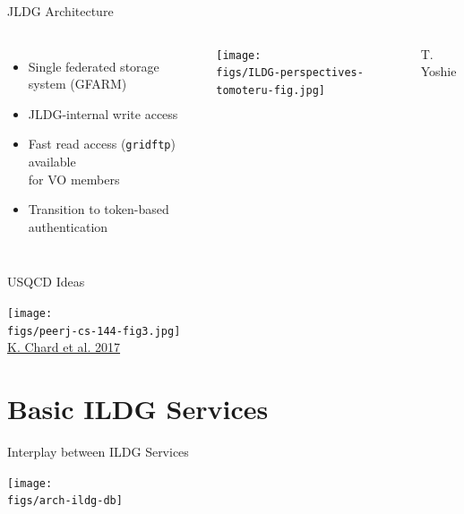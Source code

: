 \documentclass[aspectratio=169,xcolor=dvipsnames]{beamer}
\def\figs{figs3}
\begin{document}
\begin{frame}{JLDG Architecture}

  \begin{columns}[c]  
    \begin{itemize}
    \item Single federated storage system (GFARM)
    \item JLDG-internal write access
    \item Fast read access ({\tt gridftp}) available\\
          for VO members
    \item Transition to token-based authentication
    \end{itemize}
    \vspace*{20mm}
    
    \texttt{[image: \\figs/ILDG-perspectives-tomoteru-fig.jpg]}
    \\
    \footnotesize{\centerline{T. Yoshie}}
  \end{columns}
  
\end{frame}
\begin{frame}{USQCD Ideas}
  \begin{center}
    \texttt{[image: \\figs/peerj-cs-144-fig3.jpg]}
    \\
    \footnotesize{\href{https://doi.org/10.7717/peerjcs.144/fig-3}{K. Chard et al. 2017}}
  \end{center}

\end{frame}

\section{Basic ILDG Services}
\begin{frame}{Interplay between ILDG Services}
  \begin{center}
    \texttt{[image: \\figs/arch-ildg-db]}
  \end{center}

\end{frame}
\end{document}
